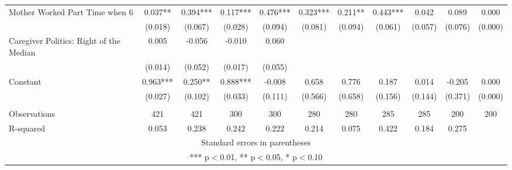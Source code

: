 \begin{tabular}{lcccccccccc}
Mother Worked Part Time when 6 & 0.037** & 0.394*** & 0.117*** & 0.476*** & 0.323*** & 0.211** & 0.443*** & 0.042 & 0.089 & 0.000 \\
 & (0.018) & (0.067) & (0.028) & (0.094) & (0.081) & (0.094) & (0.061) & (0.057) & (0.076) & (0.000) \\
Caregiver Politics: Right of the Median & 0.005 & -0.056 & -0.010 & 0.060 &  &  &  &  &  &  \\
 & (0.014) & (0.052) & (0.017) & (0.055) &  &  &  &  &  &  \\
Constant & 0.963*** & 0.250** & 0.888*** & -0.008 & 0.658 & 0.776 & 0.187 & 0.014 & -0.205 & 0.000 \\
 & (0.027) & (0.102) & (0.033) & (0.111) & (0.566) & (0.658) & (0.156) & (0.144) & (0.371) & (0.000) \\
 &  &  &  &  &  &  &  &  &  &  \\
Observations & 421 & 421 & 300 & 300 & 280 & 280 & 285 & 285 & 200 & 200 \\
 R-squared & 0.053 & 0.238 & 0.242 & 0.222 & 0.214 & 0.075 & 0.422 & 0.184 & 0.275 &  \\ \hline
\multicolumn{11}{c}{ Standard errors in parentheses} \\
\multicolumn{11}{c}{ *** p$<$0.01, ** p$<$0.05, * p$<$0.10} \\
\end{tabular}
